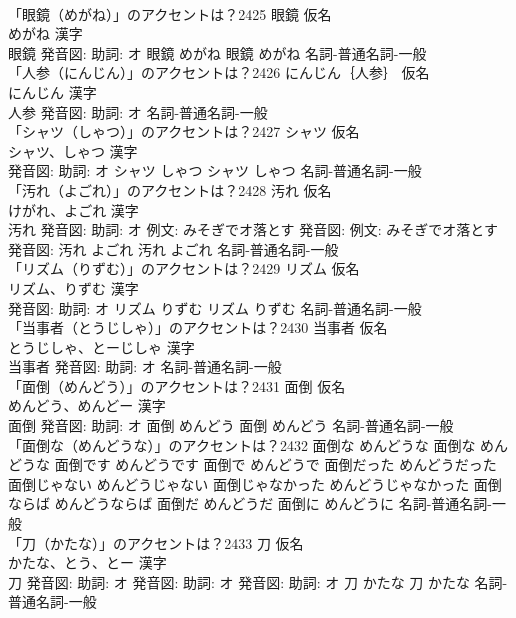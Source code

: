 \documentclass[8pt]{extreport}
\begin{document}
\begin{CJK}{UTF8}{min}
\\	「眼鏡（めがね）」のアクセントは？2425	眼鏡 仮名　
\\	めがね 漢字　
\\	眼鏡 発音図: 助詞: オ	眼鏡 めがね		眼鏡 めがね				名詞-普通名詞-一般 
\\	「人参（にんじん）」のアクセントは？2426	にんじん｛人参｝ 仮名　
\\	にんじん 漢字　
\\	人参 発音図: 助詞: オ							名詞-普通名詞-一般 
\\	「シャツ（しゃつ）」のアクセントは？2427	シャツ 仮名　
\\	シャツ、しゃつ 漢字　
\\	発音図: 助詞: オ	シャツ しゃつ		シャツ しゃつ				名詞-普通名詞-一般 
\\	「汚れ（よごれ）」のアクセントは？2428	汚れ 仮名　
\\	けがれ、よごれ 漢字　
\\	汚れ 発音図: 助詞: オ 例文: みそぎでオ落とす 発音図: 例文: みそぎでオ落とす 発音図:	汚れ よごれ		汚れ よごれ				名詞-普通名詞-一般 
\\	「リズム（りずむ）」のアクセントは？2429	リズム 仮名　
\\	リズム、りずむ 漢字　
\\	発音図: 助詞: オ	リズム りずむ		リズム りずむ				名詞-普通名詞-一般 
\\	「当事者（とうじしゃ）」のアクセントは？2430	当事者 仮名　
\\	とうじしゃ、とーじしゃ 漢字　
\\	当事者 発音図: 助詞: オ							名詞-普通名詞-一般 
\\	「面倒（めんどう）」のアクセントは？2431	面倒 仮名　
\\	めんどう、めんどー 漢字　
\\	面倒 発音図: 助詞: オ	面倒 めんどう		面倒 めんどう				名詞-普通名詞-一般 
\\	「面倒な（めんどうな）」のアクセントは？2432		面倒な めんどうな		面倒な めんどうな 面倒です めんどうです 面倒で めんどうで 面倒だった めんどうだった 面倒じゃない めんどうじゃない 面倒じゃなかった めんどうじゃなかった 面倒ならば めんどうならば 面倒だ めんどうだ 面倒に めんどうに				名詞-普通名詞-一般 
\\	「刀（かたな）」のアクセントは？2433	刀 仮名　
\\	かたな、とう、とー 漢字　
\\	刀 発音図: 助詞: オ 発音図: 助詞: オ 発音図: 助詞: オ	刀 かたな		刀 かたな				名詞-普通名詞-一般 

\end{CJK}
\end{document}
